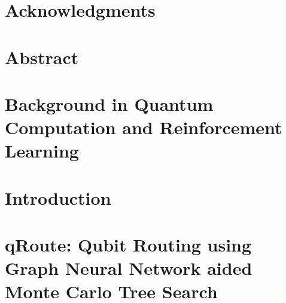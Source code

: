 \documentclass[11pt]{book}
\renewcommand{\baselinestretch}{1.2}
\begin{document}



\newpage
\thispagestyle{empty}
\renewcommand{\thesisdedication}{{\large Copyright \copyright~~Animesh Sinha, 2022\\}{\large All Rights Reserved\\}}
\thesisdedicationpage



\newpage
\thispagestyle{empty}
\renewcommand{\thesisdedication}{\large To Compute}
\thesisdedicationpage

\mastersthesis
\renewcommand{\baselinestretch}{1.5}

\chapter*{Acknowledgments}
\label{ch:ack}


\chapter*{Abstract}
\label{ch:abstract}


\tableofcontents
\listoffigures
\listoftables


\chapter{Background in Quantum Computation and Reinforcement Learning}
\label{ch:background}



\chapter{Introduction}
\label{ch:intro}


\chapter{qRoute: Qubit Routing using Graph Neural Network aided Monte Carlo Tree Search}
\label{ch:qroute}

\end{document}
